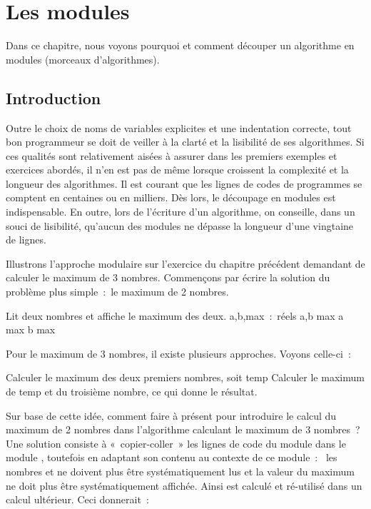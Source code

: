 \chapter{Les modules}

	Dans ce chapitre, nous voyons pourquoi et comment découper un algorithme
	en modules (morceaux d’algorithmes).

\section{Introduction}

	Outre le choix de noms de variables explicites et une indentation
	correcte, tout bon programmeur se doit de veiller à la clarté et la
	lisibilité de ses algorithmes. Si ces qualités sont relativement aisées
	à assurer dans les premiers exemples et exercices abordés, il n’en est
	pas de même lorsque croissent la complexité et la longueur des
	algorithmes. Il est courant que les lignes de codes de programmes se
	comptent en centaines ou en milliers. Dès lors, le découpage en modules
	est indispensable. En outre, lors de l’écriture d’un algorithme, on 
	conseille, dans un souci de lisibilité, qu’aucun des modules
	ne dépasse la longueur d’une vingtaine de lignes.
	
	Illustrons l’approche modulaire sur l’exercice du chapitre précédent
	demandant de calculer le maximum de 3 nombres. Commençons par écrire la
	solution du problème plus simple~:~le maximum de 2 nombres.

	\begin{Pseudocode}
		\RComment Lit deux nombres et affiche le maximum des deux.
		\Decl a,b,max~:~réels
		\Read a,b
			\Let max \Gets a
		\Else
			\Let max \Gets b
		\EndIf
		\Write max
	\EndModule
	\end{Pseudocode}
	
	Pour le maximum de 3 nombres, il existe plusieurs approches.
	Voyons celle-ci~:

	\begin{Pseudocode}
		\Stmt Calculer le maximum des deux premiers nombres, soit temp
		\Stmt Calculer le maximum de temp et du troisième nombre, ce qui donne le résultat.
	\end{Pseudocode}

	Sur base de cette idée, 
	comment faire à présent
	pour introduire le calcul du maximum de 2 nombres 
	dans l’algorithme calculant le maximum de 3 nombres~? 
	Une solution consiste à «~copier-coller~» 
	les lignes de code du module 
	dans le module ,
	toutefois en adaptant son contenu au contexte de ce module~:~
	les nombres  et 
	ne doivent plus être systématiquement lus 
	et la valeur du maximum ne doit plus être systématiquement affichée. 
	Ainsi  est calculé 
	et ré-utilisé dans un calcul ultérieur. 
	Ceci donnerait~:

